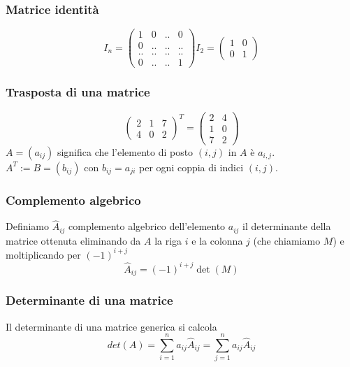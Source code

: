 \documentclass{article}
\numberwithin{equation}{subsection}
\begin{document}
\subsubsection{Matrice identità}
$$ I_n = \begin{pmatrix}
1 & 0 & .. & 0\\
0 & .. & .. & .. \\
.. & .. & .. & ..  \\
0 & .. & .. & 1
\end{pmatrix} I_2 = \begin{pmatrix} 1 & 0 \\ 0 & 1 \end{pmatrix} $$


\subsubsection{Trasposta di una matrice}
$$\begin{pmatrix}
2 & 1 & 7 \\
4 & 0 & 2
\end{pmatrix}^T = \begin{pmatrix}2 & 4 \\ 1 & 0 \\ 7 & 2 \end{pmatrix} $$
$A = (a_{ij})$ significa che l'elemento di posto $(i,j)$ in $A$ è $a_{i,j}$.
\vspace{0.2cm}\\
$A^T := B = (b_{ij})$ con $b_{ij} = a_{ji}$ per ogni coppia di indici $(i,j)$.


\subsubsection{Complemento algebrico}
Definiamo $\hat A_{ij}$ complemento algebrico dell'elemento $a_{ij}$ il determinante della matrice ottenuta eliminando da $A$ la riga $i$ e la colonna $j$ (che chiamiamo $M$) e moltiplicando per $(-1)^{i+j}$
\begin{equation*}
    \hat A_{ij} = (-1)^{i+j} \det(M)
\end{equation*}


\subsubsection{Determinante di una matrice}
Il determinante di una matrice generica si calcola
\begin{equation*}
    det(A) = \sum_{i=1}^n a_{ij} \hat A_{ij} = \sum_{j=1}^n a_{ij} \hat A_{ij}
\end{equation*}
\end{document}
